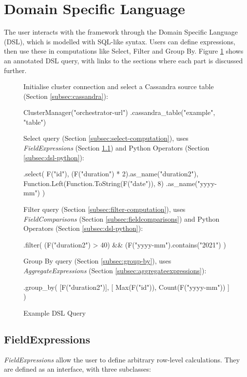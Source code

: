\section{Domain Specific Language}
The user interacts with the framework through the Domain Specific Language (DSL), which is modelled with SQL-like syntax. Users can define expressions, then use these in computations like Select, Filter and Group By. Figure \ref{fig:dsl-high-level-example} shows an annotated DSL query, with links to the sections where each part is discussed further.

\begin{figure}[htp]
	Initialise cluster connection and select a Cassandra source table (Section \ref{subsec:cassandra}):
	\begin{python}
ClusterManager("orchestrator-url")
  .cassandra_table("example", "table")
	\end{python}
	
	Select query (Section \ref{subsec:select-computation}), uses \textit{FieldExpressions} (Section \ref{subsec:fieldexpressions}) and Python Operators (Section \ref{subsec:dsl-python}):
	\begin{python}
  .select(
    F("id"),
    (F("duration") * 2).as_name("duration2"),
    Function.Left(Function.ToString(F("date")), 8)
      .as_name("yyyy-mm")
  )
	\end{python}

	Filter query (Section \ref{subsec:filter-computation}), uses \textit{FieldComparisons} (Section \ref{subsec:fieldcomparisons}) and Python Operators (Section \ref{subsec:dsl-python}):
	\begin{python}
  .filter(
    (F("duration2") > 40) && 
  	(F("yyyy-mm").contains("2021")
  )
	\end{python}

	Group By query (Section \ref{subsec:group-by}), uses \textit{AggregateExpressions} (Section \ref{subsec:aggregateexpressions}):
	\begin{python}
  .group_by(
    [F("duration2")],
    [
      Max(F("id")),
      Count(F("yyyy-mm"))
    ]
  )
	\end{python}
	\caption{Example DSL Query}
	\label{fig:dsl-high-level-example}
\end{figure}


\subsection{FieldExpressions}\label{subsec:fieldexpressions}
\textit{FieldExpressions} allow the user to define arbitrary row-level calculations. They are defined as an interface, with three subclasses:

